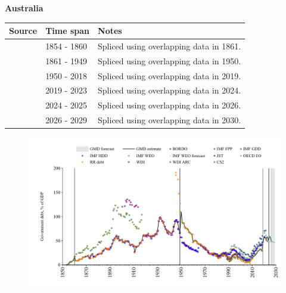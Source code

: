 \documentclass[12pt,a4paper,landscape]{article}
\begin{document}
\begin{adjustbox}{max totalsize={\paperwidth}{\paperheight},center}
\begin{minipage}[t][\textheight][t]{\textwidth}
\vspace*{0.5cm}
{}
\begin{center}
{\Large\bfseries Australia}
\end{center}
\vspace{0.5cm}
\begin{table}[H]
\centering
\small
\begin{tabular}{|l|l|l|}
\hline
\textbf{Source} & \textbf{Time span} & \textbf{Notes} \\
\hline
\rowcolor{white}\cite{CS2_AUS}& 1854 - 1860 &Spliced using overlapping data in 1861.\\
\rowcolor{lightgray}\cite{IMF_FPP}& 1861 - 1949 &Spliced using overlapping data in 1950.\\
\rowcolor{white}\cite{IMF_GDD}& 1950 - 2018 &Spliced using overlapping data in 2019.\\
\rowcolor{lightgray}\cite{IMF_FPP}& 2019 - 2023 &Spliced using overlapping data in 2024.\\
\rowcolor{white}\cite{OECD_EO}& 2024 - 2025 &Spliced using overlapping data in 2026.\\
\rowcolor{lightgray}\cite{IMF_WEO_forecast}& 2026 - 2029 &Spliced using overlapping data in 2030.\\
\hline
\end{tabular}
\end{table}
\begin{figure}[H]
\centering
\includegraphics[width=\textwidth,height=0.6\textheight,keepaspectratio]{graphs/AUS_govdebt_GDP.pdf}
\end{figure}
\end{minipage}
\end{adjustbox}
\end{document}
